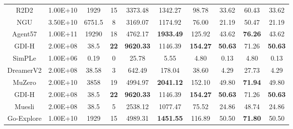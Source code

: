 \documentclass[nohyperref]{article}
\def\GDIHmeanhns{9620.33}
\def\GDIHmedianhns{1146.39}
\def\GDIHHWRB{22}
\def\GDIHmeanHWRNS{154.27}
\def\GDIHmedianHWRNS{50.63}
\def\GDIHmeanSABER{71.26}
\def\GDIHmedianSABER{50.63}
\def\GDIHnumframes{2.00E+08}
\def\GDIHgametime{38.5}
\def\rtdtmeanhns{3373.48}
\def\rtdtmedianhns{1342.27}
\def\rtdtHWRB{15}
\def\rtdtmeanHWRNS{98.78}
\def\rtdtmedianHWRNS{33.62}
\def\rtdtmeanSABER{60.43}
\def\rtdtmedianSABER{33.62}
\def\rtdtnumframes{1.00E+10}
\def\rtdtgametime{1929}
\def\ngumeanhns{3169.07}
\def\ngumedianhns{1174.92}
\def\nguHWRB{8}
\def\ngumeanHWRNS{76.00}
\def\ngumedianHWRNS{21.19}
\def\ngumeanSABER{50.47}
\def\ngumedianSABER{21.19}
\def\ngunumframes{3.50E+10}
\def\ngugametime{6751.5}
\def\agentmeanhns{4762.17}
\def\agentmedianhns{1933.49}
\def\agentHWRB{18}
\def\agentmeanHWRNS{125.92}
\def\agentmedianHWRNS{43.62}
\def\agentmeanSABER{76.26}
\def\agentmedianSABER{43.62}
\def\agentnumframes{1.00E+11}
\def\agentgametime{19290}
\def\muzeromeanhns{4994.97}
\def\muzeromedianhns{2041.12}
\def\muzeroHWRB{19}
\def\muzeromeanHWRNS{152.10}
\def\muzeromedianHWRNS{49.80}
\def\muzeromeanSABER{71.94}
\def\muzeromedianSABER{49.80}
\def\muzeronumframes{2.00E+10}
\def\muzerogametime{3858}
\def\dreamermeanhns{642.49}
\def\dreamermedianhns{178.04}
\def\dreamerHWRB{3}
\def\dreamermeanHWRNS{38.60}
\def\dreamermedianHWRNS{4.29}
\def\dreamermeanSABER{27.73}
\def\dreamermedianSABER{4.29}
\def\dreamernumframes{2.00E+08}
\def\dreamergametime{38.58 }
\def\simplemeanhns{25.78}
\def\simplemedianhns{5.55}
\def\simpleHWRB{0}
\def\simplemeanHWRNS{4.80}
\def\simplemedianHWRNS{0.13}
\def\simplemeanSABER{4.80}
\def\simplemedianSABER{0.13}
\def\simplenumframes{1.00E+06}
\def\simplegametime{0.19}
\def\mueslimeanhns{2538.12}
\def\mueslimedianhns{1077.47}
\def\muesliHWRB{5}
\def\mueslimeanHWRNS{75.52}
\def\mueslimedianHWRNS{24.86}
\def\mueslimeanSABER{48.74}
\def\mueslimedianSABER{24.86}
\def\mueslinumframes{2.00E+08}
\def\muesligametime{38.5}
\def\goexploremeanhns{4989.31}
\def\goexploremedianhns{1451.55}
\def\goexploreHWRB{15}
\def\goexploremeanHWRNS{116.89}
\def\goexploremedianHWRNS{50.50}
\def\goexploremeanSABER{71.80}
\def\goexploremedianSABER{50.50}
\def\goexplorenumframes{1.00E+10}
\def\goexploregametime{1929}
\theoremstyle{plain}
\begin{document}
\begin{table}[H]
\begin{tabular}{ |c | c | c | c| c c | c c |c c|}
R2D2        &\rtdtnumframes   &\rtdtgametime     & \rtdtHWRB & \rtdtmeanhns & \rtdtmedianhns &\rtdtmeanHWRNS  & \rtdtmedianHWRNS& \rtdtmeanSABER & \rtdtmedianSABER \\
NGU         &\ngunumframes & \ngugametime    & \nguHWRB  & \ngumeanhns & \ngumedianhns    &\ngumeanHWRNS  & \ngumedianHWRNS& \ngumeanSABER & \ngumedianSABER\\
Agent57     &\agentnumframes   & \agentgametime      & \agentHWRB & \agentmeanhns & \textbf{\agentmedianhns}    &\agentmeanHWRNS & \agentmedianHWRNS& \textbf{\agentmeanSABER} & \agentmedianSABER\\
\hline
\hline
GDI-H   &\GDIHnumframes    & \GDIHgametime      & \textbf{\GDIHHWRB} & \textbf{\GDIHmeanhns} & \GDIHmedianhns     &\textbf{\GDIHmeanHWRNS} &\textbf{\GDIHmedianHWRNS} & \GDIHmeanSABER & \textbf{\GDIHmedianSABER}\\
SimPLe      &\simplenumframes   & \simplegametime  & \simpleHWRB  & \simplemeanhns   & \simplemedianhns       &\simplemeanHWRNS   & \simplemedianHWRNS & \simplemeanSABER  & \simplemedianSABER\\
DreamerV2   &\dreamernumframes    & \dreamergametime     & \dreamerHWRB  & \dreamermeanhns  & \dreamermedianhns     &\dreamermeanHWRNS  & \dreamermedianHWRNS & \dreamermeanSABER & \dreamermedianSABER \\
MuZero      & \muzeronumframes   & \muzerogametime     & \muzeroHWRB & \muzeromeanhns & \textbf{\muzeromedianhns}    &\muzeromeanHWRNS & \muzeromedianHWRNS& \textbf{\muzeromeanSABER} & \muzeromedianSABER \\
\hline
\hline
GDI-H    &\GDIHnumframes    & \GDIHgametime       & \textbf{\GDIHHWRB} & \textbf{\GDIHmeanhns} & \GDIHmedianhns     &\textbf{\GDIHmeanHWRNS} &\textbf{\GDIHmedianHWRNS} & \GDIHmeanSABER & \textbf{\GDIHmedianSABER}\\
Muesli      &\mueslinumframes    & \muesligametime     & \muesliHWRB           &  \mueslimeanhns         & \mueslimedianhns    & \mueslimeanHWRNS          & \mueslimedianHWRNS  & \mueslimeanSABER & \mueslimedianSABER \\
Go-Explore  & \goexplorenumframes   & \goexploregametime     & \goexploreHWRB & \goexploremeanhns & \textbf{\goexploremedianhns}    &\goexploremeanHWRNS & \goexploremedianHWRNS& \textbf{\goexploremeanSABER} & \goexploremedianSABER\\
\hline
\end{tabular}
\end{table}
\end{document}
